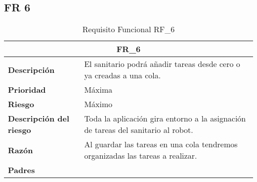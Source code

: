 \documentclass{scrreprt}
\begin{document}
\subsection{FR 6}
\begin{table}[H]

    \label{tab:my-table}
    
    \begin{tabular}{|p{5cm}|p{11cm}|}
    \hline
    \multicolumn{2}{|c|}{\textbf{FR_6}} \\
    \hline
    \textbf{Descripción  }                      &  El sanitario podrá añadir tareas desde cero o ya creadas a una cola.                                                                           \\ \hline
    \textbf{Prioridad}                          & Máxima                                                                                              \\ \hline
    \textbf{Riesgo}                          & Máximo                                                                                                \\ \hline
    \textbf{Descripción del riesgo}                    & Toda la aplicación gira entorno a la asignación de tareas del sanitario al robot.                                                                          \\ \hline
    \textbf{Razón}                   & Al guardar las tareas en una cola tendremos organizadas las tareas a realizar.                                                                                              \\ \hline
    \textbf{Padres}                               &  \\  \hline
    \end{tabular}%
    
    \caption{Requisito Funcional RF_6}
\end{table}
\end{document}
